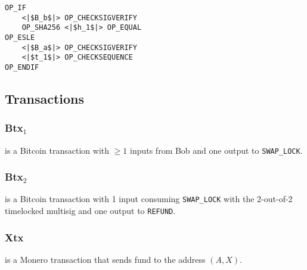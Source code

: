 \documentclass{llncs}
\begin{document}
\begin{verbatim}
OP_IF
    <|$B_b$|> OP_CHECKSIGVERIFY
    OP_SHA256 <|$h_1$|> OP_EQUAL
OP_ESLE
    <|$B_a$|> OP_CHECKSIGVERIFY
    <|$t_1$|> OP_CHECKSEQUENCE
OP_ENDIF
\end{verbatim}

\subsection{Transactions}
\subsubsection{Btx$_1$}
is a Bitcoin transaction with $\geq 1$ inputs from Bob and one output to \texttt{SWAP\_LOCK}.

\subsubsection{Btx$_2$}
is a Bitcoin transaction with 1 input consuming \texttt{SWAP\_LOCK} with the 2-out-of-2 timelocked multisig and one output to \texttt{REFUND}.

\subsubsection{Xtx}
is a Monero transaction that sends fund to the address $(A,X)$.


%
%
\printbibliography
\end{document}
